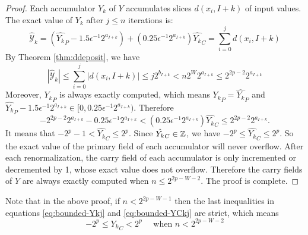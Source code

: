 \begin{proof}
    Each accumulator $Y_k$ of $Y$ accumulates slices $d(x_i, I + k)$ of input values.
    The exact value of $Y_k$ after $j \leq n$ iterations is:
    \begin{equation}
        \mathcal{\hat{Y}}_k = ({\hat{Y_k}}_P - 1.5 \epsilon^{-1}2^{a_{I+k}}) + (0.25\epsilon^{-1} 2^{a_{I+k}}) \hat{Y_k}_C
        = \sum_{i=0}^{j} d(x_i, I + k)
        \label{eq:exact-Ykj}
    \end{equation}
    By Theorem \ref{thm:ddeposit}, we have 
    \begin{equation}
      |\mathcal{\hat{Y}}_k| \leq \sum_{i=0}^{j} |d(x_i, I + k)| \leq j 2^{b_{I+k}} < n 2^W 2^{a_{I+k}}
      \leq 2^{2p-2} 2^{a_{I+k}}
      \label{eq:bounded-Ykj}
    \end{equation}
    Moreover, ${Y_k}_P$ is always exactly computed, which means ${Y_k}_P = \hat{Y_k}_P$ and
    \(
        \hat{Y_k}_P - 1.5 \epsilon^{-1}2^{a_{I+k}} \in [0, 0.25 \epsilon^{-1} 2^{a_{I+k}}).
    \)
    Therefore
    \begin{equation}
        -2^{2p-2} 2^{a_{I+k}} -  0.25 \epsilon^{-1} 2^{a_{I+k}} < (0.25\epsilon^{-1} 2^{a_{I+k}}) \hat{Y_k}_C
            \leq 2^{2p-2} 2^{a_{I+k}}.
            \label{eq:bounded-YCkj}
    \end{equation}
    It means that $-2^p - 1 < \hat{Y_k}_C \leq 2^p$.
    Since $\hat{Y_k}_C \in \mathbb{Z}$, we have $-2^p \leq \hat{Y_k}_C \leq 2^p$. So the exact value of the primary field
    of each accumulator will never overflow.
    After each renormalization, the carry field of each accumulator is only incremented or decremented by 1,
    whose exact value does not overflow.
    Therefore the carry fields of $Y$ are always exactly computed when $n \leq 2^{2p-W -2}$.
    The proof is complete.
  \end{proof}

    Note that in the above proof, if $n < 2^{2p-W-1}$ then the last inequalities in equations \eqref{eq:bounded-Ykj}
    and \eqref{eq:bounded-YCkj} are strict, which means
    \begin{equation}
        -2^p \leq {Y_k}_C < 2^p \quad \text{ when } n < 2^{2p-W-2}
    \end{equation}


